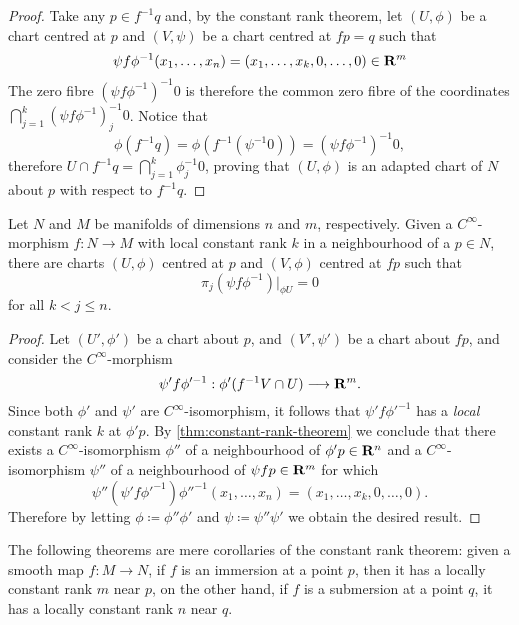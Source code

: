 \begin{proof}
    Take any \(p \in f^{-1} q\) and, by the constant rank theorem, let \((U, \phi)\)
    be a chart centred at \(p\) and \((V, \psi)\) be a chart centred at \(f p = q\)
    such that
    \[
        \psi f \phi^{-1}(x_1, \dots, x_n) = (x_1, \dots, x_k, 0, \dots, 0) \in \mathbf{R}^m
    \]
    The zero fibre \((\psi f \phi^{-1})^{-1} 0\) is therefore the common zero fibre
    of the coordinates \(\bigcap_{j=1}^k (\psi f \phi^{-1})_j^{-1} 0\). Notice that
    \[
        \phi(f^{-1} q) = \phi (f^{-1}(\psi^{-1} 0)) = (\psi f \phi^{-1})^{-1} 0,
    \]
    therefore \(U \cap f^{-1} q = \bigcap_{j=1}^k \phi_j^{-1} 0\), proving that
    \((U, \phi)\) is an adapted chart of \(N\) about \(p\) with respect to
    \(f^{-1} q\).
\end{proof}

\begin{theorem}
    \label{thm:constant-rank-theorem-manifolds}
    Let \(N\) and \(M\) be manifolds of dimensions \(n\) and \(m\),
    respectively. Given a \(C^{\infty}\)-morphism \(f: N \to M\) with local constant
    rank \(k\) in a neighbourhood of a \(p \in N\), there are charts \((U, \phi)\)
    centred at \(p\) and \((V, \phi)\) centred at \(f p\) such that
    \[
        \pi_j (\psi f \phi^{-1})|_{\phi U} = 0
    \]
    for all \(k < j \leq n\).
\end{theorem}

\begin{proof}
    Let \((U', \phi')\) be a chart about \(p\), and \((V', \psi')\) be a chart about
    \(f p\), and consider the \(C^{\infty}\)-morphism
    \[
        \psi' f \phi'^{-1}: \phi'(f^{-1} V \cap U) \longrightarrow \mathbf{R}^m.
    \]
    Since both \(\phi'\) and \(\psi'\) are \(C^{\infty}\)-isomorphism, it follows
    that \(\psi' f \phi'^{-1}\) has a \emph{local} constant rank \(k\) at
    \(\phi' p\). By \cref{thm:constant-rank-theorem} we conclude that there exists a
    \(C^{\infty}\)-isomorphism \(\phi''\) of a neighbourhood of \(\phi' p \in \mathbf{R}^n\)
    and a \(C^{\infty}\)-isomorphism \(\psi''\) of a neighbourhood of
    \(\psi f p \in \mathbf{R}^m\) for which
    \[
        \psi'' (\psi' f \phi'^{-1}) \phi''^{-1}(x_1, \dots, x_n)
        = (x_1, \dots, x_k, 0, \dots, 0).
    \]
    Therefore by letting \(\phi \coloneq \phi'' \phi'\) and \(\psi \coloneq \psi''
    \psi'\) we obtain the desired result.
\end{proof}

The following theorems are mere corollaries of the constant rank theorem: given
a smooth map \(f: M \to N\), if \(f\) is an immersion at a point \(p\), then it
has a locally constant rank \(m\) near \(p\), on the other hand, if \(f\) is a
submersion at a point \(q\), it has a locally constant rank \(n\) near \(q\).

